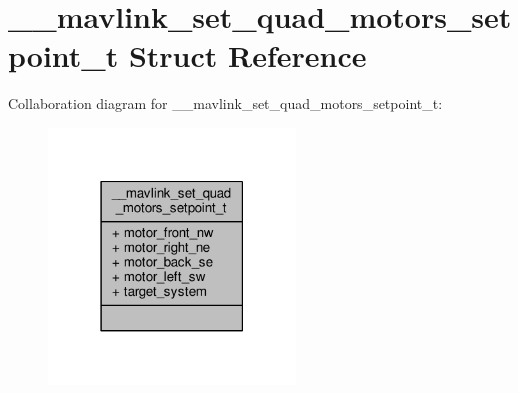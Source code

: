 \hypertarget{struct____mavlink__set__quad__motors__setpoint__t}{\section{\+\_\+\+\_\+mavlink\+\_\+set\+\_\+quad\+\_\+motors\+\_\+setpoint\+\_\+t Struct Reference}
\label{struct____mavlink__set__quad__motors__setpoint__t}
}


Collaboration diagram for \+\_\+\+\_\+mavlink\+\_\+set\+\_\+quad\+\_\+motors\+\_\+setpoint\+\_\+t\+:
\nopagebreak
\begin{figure}[H]
\begin{center}
\leavevmode
\includegraphics[width=186pt]{struct____mavlink__set__quad__motors__setpoint__t__coll__graph}
\end{center}
\end{figure}
